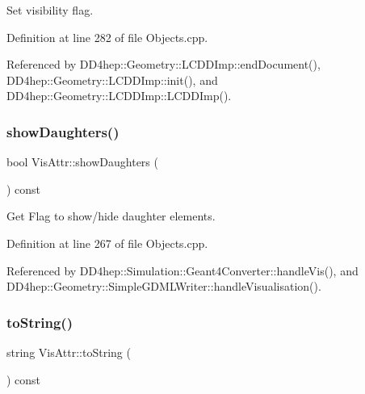 Set visibility flag. 



Definition at line 282 of file Objects.\+cpp.



Referenced by D\+D4hep\+::\+Geometry\+::\+L\+C\+D\+D\+Imp\+::end\+Document(), D\+D4hep\+::\+Geometry\+::\+L\+C\+D\+D\+Imp\+::init(), and D\+D4hep\+::\+Geometry\+::\+L\+C\+D\+D\+Imp\+::\+L\+C\+D\+D\+Imp().

\hypertarget{class_d_d4hep_1_1_geometry_1_1_vis_attr_a4fca55563416a5f9304fb0a8a1001b5c}{}\label{class_d_d4hep_1_1_geometry_1_1_vis_attr_a4fca55563416a5f9304fb0a8a1001b5c} 
\subsubsection{\texorpdfstring{show\+Daughters()}{showDaughters()}}
{\footnotesize\ttfamily bool Vis\+Attr\+::show\+Daughters (\begin{DoxyParamCaption}{ }\end{DoxyParamCaption}) const}



Get Flag to show/hide daughter elements. 



Definition at line 267 of file Objects.\+cpp.



Referenced by D\+D4hep\+::\+Simulation\+::\+Geant4\+Converter\+::handle\+Vis(), and D\+D4hep\+::\+Geometry\+::\+Simple\+G\+D\+M\+L\+Writer\+::handle\+Visualisation().

\hypertarget{class_d_d4hep_1_1_geometry_1_1_vis_attr_af371a9c2991680745a8e48be921807d1}{}\label{class_d_d4hep_1_1_geometry_1_1_vis_attr_af371a9c2991680745a8e48be921807d1} 
\subsubsection{\texorpdfstring{to\+String()}{toString()}}
{\footnotesize\ttfamily string Vis\+Attr\+::to\+String (\begin{DoxyParamCaption}{ }\end{DoxyParamCaption}) const}




